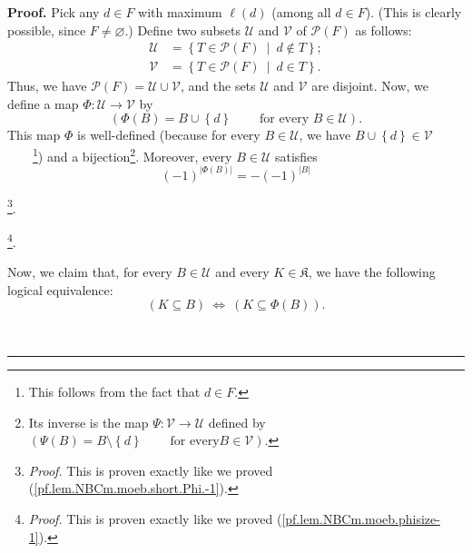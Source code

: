 \documentclass[numbers=enddot,12pt,final,onecolumn,notitlepage]{scrartcl}%
\theoremstyle{definition}
\newenvironment{proof}[1][Proof]{\noindent\textbf{#1.} }{\ \rule{0.5em}{0.5em}}
\newenvironment{verlong}{}{}
\newenvironment{vershort}{}{}
\begin{document}
\begin{proof}
Pick any $d\in F$ with maximum $\ell\left(  d\right)  $ (among all $d\in F$).
(This is clearly possible, since $F\neq\varnothing$.) Define two subsets
$\mathcal{U}$ and $\mathcal{V}$ of $\mathcal{P}\left(  F\right)  $ as follows:%
\begin{align*}
\mathcal{U}  &  =\left\{  T\in\mathcal{P}\left(  F\right)  \ \mid\ d\notin
T\right\}  ;\\
\mathcal{V}  &  =\left\{  T\in\mathcal{P}\left(  F\right)  \ \mid\ d\in
T\right\}  .
\end{align*}
Thus, we have $\mathcal{P}\left(  F\right)  =\mathcal{U}\cup\mathcal{V}$, and
the sets $\mathcal{U}$ and $\mathcal{V}$ are disjoint. Now, we define a map
$\Phi:\mathcal{U}\rightarrow\mathcal{V}$ by%
\[
\left(  \Phi\left(  B\right)  =B\cup\left\{  d\right\}
\ \ \ \ \ \ \ \ \ \ \text{for every }B\in\mathcal{U}\right)  .
\]
This map $\Phi$ is well-defined (because for every $B\in\mathcal{U}$, we have
$B\cup\left\{  d\right\}  \in\mathcal{V}$\ \ \ \ \footnote{This follows from
the fact that $d\in F$.}) and a bijection\footnote{Its inverse is the map
$\Psi:\mathcal{V}\rightarrow\mathcal{U}$ defined by $\left(  \Psi\left(
B\right)  =B\setminus\left\{  d\right\}  \ \ \ \ \ \ \ \ \ \ \text{for every
}B\in\mathcal{V}\right)  $.}. Moreover, every $B\in\mathcal{U}$ satisfies%
\begin{equation}
\left(  -1\right)  ^{\left\vert \Phi\left(  B\right)  \right\vert }=-\left(
-1\right)  ^{\left\vert B\right\vert }
\label{pf.lem.matroid.NBCm.moeb.short.Phi.-1}%
\end{equation}


\begin{vershort}
\noindent\footnote{\textit{Proof.} This is proven exactly like we proved
(\ref{pf.lem.NBCm.moeb.short.Phi.-1}).}.
\end{vershort}

\begin{verlong}
\noindent\footnote{\textit{Proof.} This is proven exactly like we proved
(\ref{pf.lem.NBCm.moeb.phisize-1}).}.
\end{verlong}

Now, we claim that, for every $B\in\mathcal{U}$ and every $K\in\mathfrak{K}$,
we have the following logical equivalence:%
\begin{equation}
\left(  K\subseteq B\right)  \ \Longleftrightarrow\ \left(  K\subseteq
\Phi\left(  B\right)  \right)  .
\label{pf.lem.matroid.NBCm.moeb.short.Phi.equiv}%
\end{equation}



\end{proof}
\end{document}
